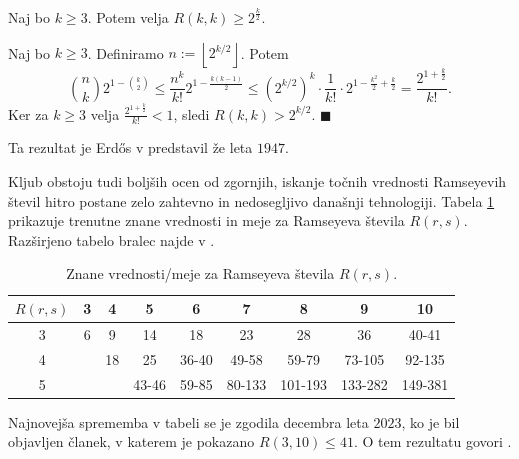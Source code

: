 \documentclass[twoside,11pt]{article}
\providecommand{\floor}[1]{\left\lfloor #1\right\rfloor}
\begin{document}
\begin{posledica}
    Naj bo $k \ge 3$. Potem velja $R(k, k) \ge 2^\frac{k}{2}$.
\end{posledica}

\begin{dokaz}
    Naj bo $k \ge 3$. Definiramo $n:=\floor{2^{k/2}}$. Potem
    \[
        \binom{n}{k}2^{1-\binom{k}{2}} \le
        \frac{n^k}{k!}2^{1-\frac{k(k-1)}{2}} \le 
        \left(2^{k/2}\right)^k \cdot \frac{1}{k!} \cdot 2^{1-\frac{k^2}{2}+\frac{k}{2}} =
        \frac{2^{1+\frac{k}{2}}}{k!}.
    \]
    Ker za $k \ge 3$ velja $\frac{2^{1+\frac{k}{2}}}{k!} < 1$, sledi $R(k, k) > 2^{k/2}$. \hfill $\blacksquare$
\end{dokaz}

Ta rezultat je Erdős v \cite{erdos} predstavil že leta $1947$.



Kljub obstoju tudi boljših ocen od zgornjih, %
iskanje točnih vrednosti Ramseyevih števil hitro postane zelo zahtevno in 
nedosegljivo današnji tehnologiji. Tabela \ref{tab:meje} prikazuje 
trenutne znane vrednosti in meje za Ramseyeva števila $R(r, s)$. 
Razširjeno tabelo bralec najde v \cite{wiki}.

\begin{table}[h!]
    \centering
    \begin{tabular}{|c||c|c|c|c|c|c|c|c|}\hline
    $R(r,s)$ & 3 & 4  & 5     & 6     & 7     & 8     & 9       & 10     \\\hline \hline
    3 & 6 & 9  & 14    & 18    & 23    & 28    & 36      & 40-41  \\\hline
    4 &   & 18 & 25    & 36-40 & 49-58 & 59-79 & 73-105 & 92-135 \\\hline
    5 &   &    & 43-46 & 59-85 & 80-133 & 101-193 & 133-282 & 149-381\\\hline
    \end{tabular}
    \caption{Znane vrednosti/meje za Ramseyeva števila $R(r, s)$.}
    \label{tab:meje}
\end{table}
Najnovejša sprememba v tabeli se je zgodila decembra leta $2023$, ko je bil objavljen 
članek, v katerem je pokazano $R(3, 10) \le 41$. 
O tem rezultatu govori \cite{r41}.
\end{document}
